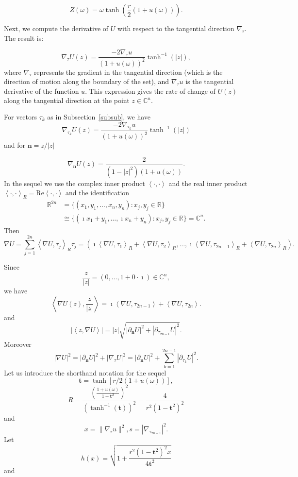 \documentclass[11pt]{amsart}
\numberwithin{equation}{section}
\begin{document}
\[
Z(\omega) = \omega \tanh\left( \frac{r}{2} (1+u(\omega)) \right).
\]

Next, we compute the derivative of \( U \) with respect to the tangential direction \( \nabla_\tau \). The result is:

\[
\nabla_\tau U(z) = \frac{-2 \nabla_\tau u}{(1 + u(\omega))^2} \tanh^{-1}(|z|),
\]
where \( \nabla_\tau \) represents the gradient in the tangential direction (which is the direction of motion along the boundary of the set), and \( \nabla_\tau u \) is the tangential derivative of the function \( u \). This expression gives the rate of change of \( U(z) \) along the tangential direction at the point \( z \in \mathbb{C}^n \).

For vectors $\tau_k$ as in Subsection~\ref{subsub}, we have
$$\nabla_{\tau_k} U(z)=\frac{-2\nabla_{\tau_k} u}{(1+u(\omega))^2}\tanh^{-1}(|z|)$$
and for $\mathbf{n}=z/|z|$

$$\nabla_{\mathbf{n}} U(z)=\frac{2}{(1-|z|^2)(1+u(\omega))}.$$  In the sequel we use the complex inner product $\left<\cdot,\cdot\right>$ and the real inner product $\left<\cdot,\cdot\right>_R=\mathrm{Re}\left<\cdot,\cdot\right>$ and the identification \[\begin{split}\mathbb{R}^{2n}&=\{(x_1,y_1,\dots, x_n, y_n):x_j, y_j\in \mathbb{R}\}\\&\cong \{(\imath x_1+y_1,\dots, \imath x_n+ y_n):x_j, y_j\in \mathbb{R}\}=\mathbb{C}^n.\end{split}\]
Then
$$\nabla U = \sum_{j=1}^{2n}\left<\nabla U,\tau_j\right>_R \tau_j=(\imath\left<\nabla U,\tau_1\right>_R+ \left<\nabla U,\tau_2\right>_R,\dots, \imath\left<\nabla U,\tau_{2n-1}\right>_R+ \left<\nabla U,\tau_{2n}\right>_R).$$

Since
$$\frac{z}{|z|}=(0,\dots, 1+0\cdot  \imath)\in \mathbb{C}^{n},$$ we have
$$\left<\nabla U(z), \frac{z}{|z|}\right > =\imath\left<\nabla U,\tau_{2n-1}\right>+ \left<\nabla U,\tau_{2n}\right>.$$
 and \begin{equation}\label{prim}|\left<z, \nabla U\right>|= |z|\sqrt{|\partial_{\mathbf{n}} U|^2+|\partial_ {\tau_{2n-1}} U|^2}.\end{equation} Moreover
\begin{equation}\label{secon}|\nabla U|^2 = |\partial_{\mathbf{n}} U|^2 + |\nabla_\tau U|^2= |\partial_{\mathbf{n}} U|^2 + \sum_{k=1}^{2n-1}|\partial_{\tau_k} U|^2 .\end{equation}
Let us introduce the shorthand notation for the sequel $$\mathbf{t}=\tanh[r/2(1+u(\omega))],$$ $$R=\frac{\left(\frac{1+u(\omega)}{1-\mathbf{t}^2}\right)^2}{(\tanh^{-1}(\mathbf{t}))^2}=\frac{4}{r^2 \left(1-\mathbf{t}^2\right)^2 }$$ and $$x=\|\nabla_\tau u\|^2,  s=|\nabla_{\tau_{2n-1}}|^2.$$
Let  $$h(x)={\sqrt{1+\frac{r^2 \left(1-\mathbf{t}^2\right)^2 x}{4\mathbf{t}^2}}} $$ and
\end{document}
